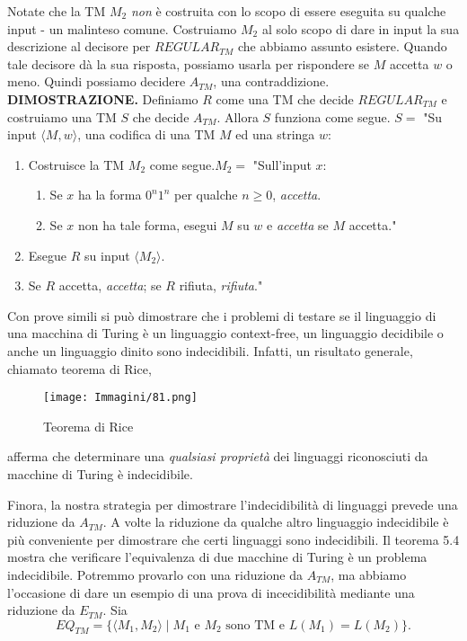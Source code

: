 \documentclass{article}
\begin{document}
Notate che la TM $M_2$ \textit{non} è costruita con lo scopo di essere eseguita su qualche input - un malinteso comune.
Costruiamo $M_2$ al solo scopo di dare in input la sua descrizione al decisore per $REGULAR_{TM}$ che abbiamo assunto esistere.
Quando tale decisore dà la sua risposta, possiamo usarla per rispondere se $M$ accetta $w$ o meno.
Quindi possiamo decidere $A_{TM}$, una contraddizione.
\vspace{1em}
\text{}
\newline
\hbox{\textbf{DIMOSTRAZIONE.}}
Definiamo $R$ come una TM che decide $REGULAR_{TM}$ e costruiamo una TM $S$ che decide $A_{TM}$.
Allora $S$ funziona come segue.
\vspace{1em}
\text{}
\newline
$S = $ "Su input $\langle M,w \rangle$, una codifica di una TM $M$ ed una stringa $w$:
\begin{enumerate}
    \item Costruisce la TM $M_2$ come segue.\newline $M_2 =$ "Sull'input $x$:
    \begin{enumerate}
        \item Se $x$ ha la forma $0^n1^n$ per qualche $n \geq 0$, \textit{accetta}.
        \item Se $x$ non ha tale forma, esegui $M$ su $w$ e \textit{accetta} se $M$ accetta."
    \end{enumerate}
    \item Esegue $R$ su input $\langle M_2 \rangle$.
    \item Se $R$ accetta, \textit{accetta}; se $R$ rifiuta, \textit{rifiuta}."
\end{enumerate}
\vspace{1em}
\text{}
\newline
Con prove simili si può dimostrare che i problemi di testare se il linguaggio di una macchina di Turing è un linguaggio context-free, un linguaggio decidibile o anche un linguaggio dinito sono indecidibili.
Infatti, un risultato generale, chiamato teorema di Rice,
\begin{figure}[H]
    \centering
    \texttt{[image: Immagini/81.png]}
    \caption{Teorema di Rice}
    \label{fig:rice_theorem}
\end{figure} 
afferma che determinare una \textit{qualsiasi proprietà} dei linguaggi riconosciuti da macchine di Turing è indecidibile.

Finora, la nostra strategia per dimostrare l'indecidibilità di linguaggi prevede una riduzione da $A_{TM}$.
A volte la riduzione da qualche altro linguaggio indecidibile è più conveniente per dimostrare che certi linguaggi sono indecidibili.
Il teorema 5.4 mostra che verificare l'equivalenza di due macchine di Turing è un problema indecidibile.
Potremmo provarlo con una riduzione da $A_{TM}$, ma abbiamo l'occasione di dare un esempio di una prova di incecidibilità mediante una riduzione da $E_{TM}$.
Sia
$$
EQ_{TM} = \{\langle M_1,M_2 \rangle \mid M_1 \text{ e } M_2 \text{ sono TM e } L(M_1) = L(M_2) \}.
$$
\end{document}
